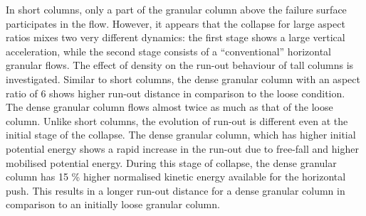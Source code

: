 In short columns, only a part of the granular column above the failure surface 
participates in the flow. However, it appears that the collapse for 
large aspect ratios mixes two very different dynamics: the first stage 
shows a large vertical acceleration, while the second stage 
consists of a ``conventional'' horizontal granular flows. The effect of density 
on the run-out behaviour of tall columns is investigated. Similar to short 
columns, the dense granular column with an aspect ratio of 6 shows higher 
run-out distance in comparison to the loose condition. The dense granular 
column flows almost twice as much as that of the loose column. Unlike short 
columns, the evolution of run-out is different even at the initial stage of the 
collapse. The dense granular column, which has higher initial potential energy 
shows a rapid increase in the run-out due to free-fall and higher mobilised 
potential energy. During this stage of collapse, the dense granular column has 
15 \% higher normalised kinetic energy available for the horizontal push. This 
results in a longer run-out distance for a dense granular column in comparison 
to an initially loose granular column.

